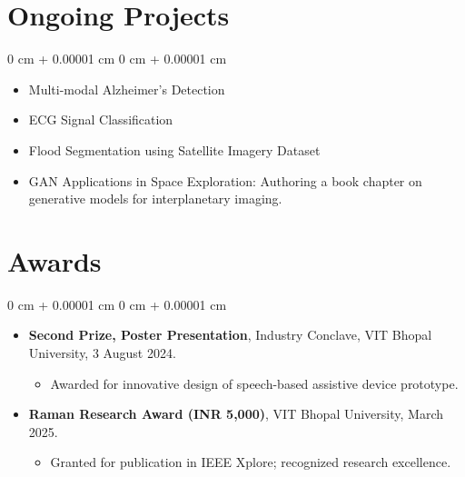 \documentclass[10pt, letterpaper]{article}
\newenvironment{highlightsforbulletentries}{
    \begin{itemize}[
        topsep=0.10 cm,
        parsep=0.10 cm,
        partopsep=0pt,
        itemsep=0pt,
        leftmargin=10pt
    ]
}{
    \end{itemize}
} %
\newenvironment{onecolentry}{
    \begin{adjustwidth}{
        0 cm + 0.00001 cm
    }{
        0 cm + 0.00001 cm
    }
}{
    \end{adjustwidth}
} %
\begin{document}
\begin{highlightsforbulletentries}
    \end{highlightsforbulletentries}

    
    \section{Ongoing Projects}
    \begin{onecolentry}
        \begin{highlightsforbulletentries}
            \item Multi-modal Alzheimer’s Detection 
            \item ECG Signal Classification
            \item Flood Segmentation using Satellite Imagery Dataset
            \item GAN Applications in Space Exploration: Authoring a book chapter on generative models for interplanetary imaging.
        \end{highlightsforbulletentries}
    \end{onecolentry}


    \section{Awards}
    \begin{onecolentry}
        \begin{highlightsforbulletentries}
            \item \textbf{Second Prize, Poster Presentation}, Industry Conclave, VIT Bhopal University, 3 August 2024.
            \begin{itemize}[leftmargin=*,topsep=0pt,itemsep=0pt]
                \item Awarded for innovative design of speech-based assistive device prototype.
            \end{itemize}

            \item \textbf{Raman Research Award (INR 5,000)}, VIT Bhopal University, March 2025.
            \begin{itemize}[leftmargin=*,topsep=0pt,itemsep=0pt]
                \item Granted for publication in IEEE Xplore; recognized research excellence.
            \end{itemize}
        \end{highlightsforbulletentries}
    \end{onecolentry}
\end{document}
